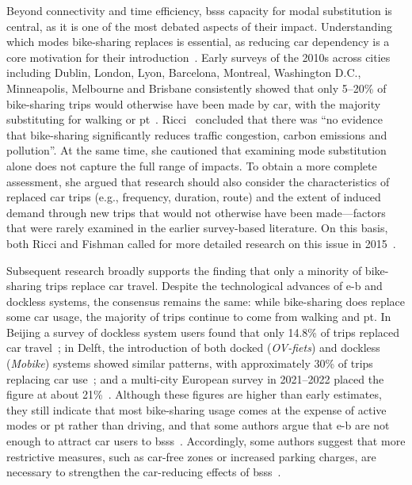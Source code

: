 Beyond connectivity and time efficiency, \acp{bss} capacity for modal substitution is central, as it is one of the most debated aspects of their impact. Understanding which modes bike-sharing replaces is essential, as reducing car dependency is a core motivation for their introduction~\cite{Fishman2016}. Early surveys of the 2010s across cities including Dublin, London, Lyon, Barcelona, Montreal, Washington D.C., Minneapolis, Melbourne and Brisbane consistently showed that only 5--20\% of bike-sharing trips would otherwise have been made by car, with the majority substituting for walking or \ac{pt}~\cite{Murphy2015, Fishman2013, Fishman2014, BachandMarleau2012}. Ricci~\cite{Ricci2015} concluded that there was “no evidence that bike-sharing significantly reduces traffic congestion, carbon emissions and pollution”. At the same time, she cautioned that examining mode substitution alone does not capture the full range of impacts. To obtain a more complete assessment, she argued that research should also consider the characteristics of replaced car trips (e.g., frequency, duration, route) and the extent of induced demand through new trips that would not otherwise have been made—factors that were rarely examined in the earlier survey-based literature. On this basis, both Ricci and Fishman called for more detailed research on this issue in 2015~\cite{Ricci2015, Fishman2016}.  

Subsequent research broadly supports the finding that only a minority of bike-sharing trips replace car travel. Despite the technological advances of \ac{e-b} and dockless systems, the consensus remains the same: while bike-sharing does replace some car usage, the majority of trips continue to come from walking and \ac{pt}. In Beijing a survey of dockless system users found that only 14.8\% of trips replaced car travel~\cite{Chen2022b}; in Delft, the introduction of both docked (\textit{OV-fiets}) and dockless (\textit{Mobike}) systems showed similar patterns, with approximately 30\% of trips replacing car use~\cite{Ma2020}; and a multi-city European survey in 2021--2022 placed the figure at about 21\%~\cite{Bosehans2024}. Although these figures are higher than early estimates, they still indicate that most bike-sharing usage comes at the expense of active modes or \ac{pt} rather than driving, and that some authors argue that \ac{e-b} are not enough to attract car users to \acp{bss}~\cite{Teixeira2023}. Accordingly, some authors suggest that more restrictive measures, such as car-free zones or increased parking charges, are necessary to strengthen the car-reducing effects of \acp{bss}~\cite{Bosehans2024}.

